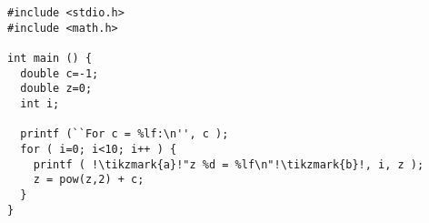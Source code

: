 \begin{lstlisting}[escapechar=!,basicstyle=\ttfamily]
#include <stdio.h>
#include <math.h>

int main () {
  double c=-1;
  double z=0;
  int i;

  printf (``For c = %lf:\n'', c );
  for ( i=0; i<10; i++ ) {
    printf ( !\tikzmark{a}!"z %d = %lf\n"!\tikzmark{b}!, i, z );
    z = pow(z,2) + c;
  }
}
\end{lstlisting}

